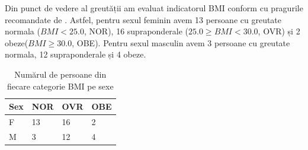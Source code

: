 \documentclass[11pt,draft]{article}
\begin{document}
  Din punct de vedere al greutății am evaluat indicatorul \ac{BMI} conform cu pragurile recomandate de \citep{whobmi06}. Astfel, pentru sexul feminin avem 13 persoane cu greutate normala ($BMI<25.0$, NOR), 16 supraponderale ($25.0 \geq BMI <30.0$, OVR) și 2 obeze($BMI \geq 30.0$, OBE). Pentru sexul masculin avem 3 persoane cu greutate normala, 12 supraponderale și 4 obeze.   
  \begin{table}[H]
  \centering
  \begin{tabular}{ |l|l|l|l| }
  \hline
  Sex & NOR & OVR & OBE \\ \hline
  F & 13 & 16 & 2 \\ \hline
  M & 3 &  12 & 4 \\ \hline
  \end{tabular}
  \caption{Numărul de persoane din fiecare categorie BMI pe sexe}
  \label{tab:BMIgSex}
\end{table}
\end{document}
